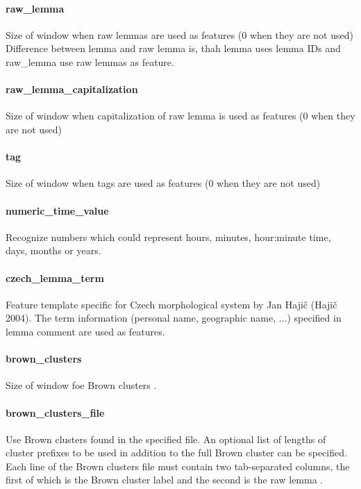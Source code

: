 \paragraph{raw\_lemma}
Size of window when raw lemmas are used as features (0 when they are not used)
Difference between lemma and raw lemma is, thah lemma uses lemma IDs and raw\_lemma use raw lemmas as feature.

\paragraph{raw\_lemma\_capitalization}
Size of window when capitalization of raw lemma is used as features (0 when they are not used)

\paragraph{tag}
Size of window when tags are used as features (0 when they are not used)

\paragraph{numeric\_time\_value}
Recognize numbers which could represent hours, minutes, hour:minute time, days,
months or years.

\paragraph{czech\_lemma\_term}
Feature template specific for Czech morphological system by Jan Hajič (Hajič 2004).
The term information (personal name, geographic name, ...) specified in lemma comment
are used as features.

\paragraph{brown\_clusters}
Size of window foe Brown clusters .

\paragraph{brown\_clusters\_file}
Use Brown clusters found in the specified file. An optional list of lengths of
cluster prefixes to be used in addition to the full Brown cluster can be specified.
Each line of the Brown clusters file must contain two tab-separated columns,
the first of which is the Brown cluster label and the second is the raw lemma .

